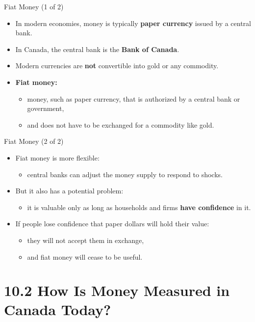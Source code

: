 \documentclass[aspectratio=169]{beamer}
\begin{document}
\begin{frame}{Fiat Money (1 of 2)}
\transfade
\begin{itemize}
  \item In modern economies, money is typically \textbf{paper currency} issued by a \alert{central bank}.
  \item In Canada, the central bank is the \textbf{Bank of Canada}.
  \item Modern currencies are \textbf{not} convertible into gold or any commodity.
  \item \textbf{Fiat money:}
  \begin{itemize}
    \item money, such as paper currency, that is authorized by a central bank or government,
    \item and does not have to be exchanged for a commodity like gold.
  \end{itemize}
\end{itemize}
\end{frame}

\begin{frame}{Fiat Money (2 of 2)}
\transfade
\begin{itemize}
  \item Fiat money is more \alert{flexible}:
  \begin{itemize}
    \item central banks can adjust the money supply to respond to shocks.
  \end{itemize}
  \item But it also has a potential problem:
  \begin{itemize}
    \item it is valuable only as long as households and firms \textbf{have confidence} in it.
  \end{itemize}
  \item If people lose confidence that paper dollars will hold their value:
  \begin{itemize}
    \item they will not accept them in exchange,
    \item and fiat money will cease to be useful.
  \end{itemize}
\end{itemize}
\end{frame}

\section{10.2 How Is Money Measured in Canada Today?}
\end{document}
